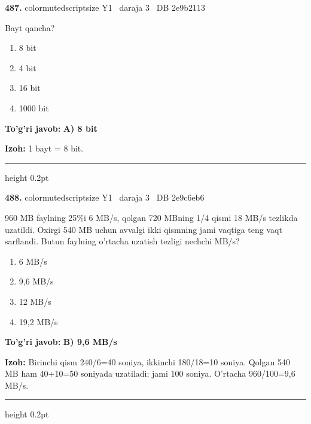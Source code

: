 \documentclass[10pt,a4paper,oneside]{article}
\begin{document}
\noindent\textbf{\color{ink}487.}  {color{muted}scriptsize Y1 \textbullet\ daraja 3 \textbullet\ DB 2e9b2113}
\par
Bayt qancha?
\begin{enumerate}[label=\Alph*),leftmargin=9mm]
\item 8 bit
\item 4 bit
\item 16 bit
\item 1000 bit
\end{enumerate}
\begin{tcolorbox}[enhanced,breakable,colback=teal!4,colframe=teal!50!black,boxrule=0.5pt,arc=1.1mm,left=3mm,right=3mm,top=1.7mm,bottom=1.7mm,before skip=2mm,after skip=2mm]
\textbf{\color{teal}To'g'ri javob:} \textbf{A) 8 bit}
\par\smallskip
\textbf{Izoh:} 1 bayt = 8 bit.
\end{tcolorbox}
\vspace{2mm}\hrule height 0.2pt \vspace{3mm}

\noindent\textbf{\color{ink}488.}  {color{muted}scriptsize Y1 \textbullet\ daraja 3 \textbullet\ DB 2e9c6eb6}
\par
960 MB faylning 25\%i 6 MB/s, qolgan 720 MBning 1/4 qismi 18 MB/s tezlikda uzatildi. Oxirgi 540 MB uchun avvalgi ikki qismning jami vaqtiga teng vaqt sarflandi. Butun faylning o'rtacha uzatish tezligi nechchi MB/s?
\begin{enumerate}[label=\Alph*),leftmargin=9mm]
\item 6 MB/s
\item 9,6 MB/s
\item 12 MB/s
\item 19,2 MB/s
\end{enumerate}
\begin{tcolorbox}[enhanced,breakable,colback=teal!4,colframe=teal!50!black,boxrule=0.5pt,arc=1.1mm,left=3mm,right=3mm,top=1.7mm,bottom=1.7mm,before skip=2mm,after skip=2mm]
\textbf{\color{teal}To'g'ri javob:} \textbf{B) 9,6 MB/s}
\par\smallskip
\textbf{Izoh:} Birinchi qism 240/6=40 soniya, ikkinchi 180/18=10 soniya. Qolgan 540 MB ham 40+10=50 soniyada uzatiladi; jami 100 soniya. O'rtacha 960/100=9,6 MB/s.
\end{tcolorbox}
\vspace{2mm}\hrule height 0.2pt \vspace{3mm}
\end{document}
